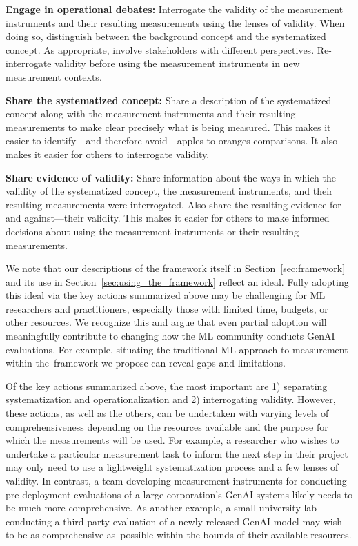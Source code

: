 \documentclass{article}
\begin{document}
\textbf{Engage in operational debates:} Interrogate the validity of the measurement instruments and their resulting measurements using the lenses of validity. When doing so, distinguish between the background concept and the systematized concept. As appropriate, involve stakeholders with different perspectives. Re-interrogate validity before using the measurement instruments in new measurement contexts.

\textbf{Share the systematized concept:} Share a description of the systematized concept along with the measurement instruments and their resulting measurements to make clear precisely what is being measured. This makes it easier to identify---and therefore avoid---apples-to-oranges comparisons. It also makes it easier for others to interrogate
validity.

\textbf{Share evidence of validity:} Share information about the ways in which the validity of the systematized concept, the measurement instruments, and their resulting measurements were interrogated. Also share the resulting evidence for---and against---their validity. This makes it easier for others to make informed decisions about using the measurement instruments or their resulting measurements.

We note that our descriptions of the framework itself in Section~\ref{sec:framework} and its use in Section~\ref{sec:using_the_framework} reflect an ideal. Fully adopting this ideal via the key actions summarized above may be challenging for ML researchers and practitioners, especially those 
with limited time, budgets, or other resources. We recognize this and argue that even partial adoption will meaningfully contribute to changing how the ML community conducts GenAI evaluations. For example,  situating the traditional ML approach to measurement within the~framework we propose can reveal gaps and limitations.

Of the key actions summarized above, the most important are 1) separating systematization and operationalization and 2) interrogating validity. However, these actions, as well as the others, can be undertaken with varying levels of comprehensiveness depending on the resources available and the purpose for which the measurements will be used. For example, a researcher who
wishes to undertake a particular measurement task to inform the next step in their project may only need to use a lightweight systematization process and a few lenses of validity.
In contrast, a team developing measurement instruments for conducting pre-deployment evaluations of a large corporation's GenAI systems likely needs to be much more comprehensive. As another example, a small university lab conducting a third-party evaluation of a newly released GenAI model may wish to be as comprehensive as~possible within the bounds of their available resources.
\end{document}
